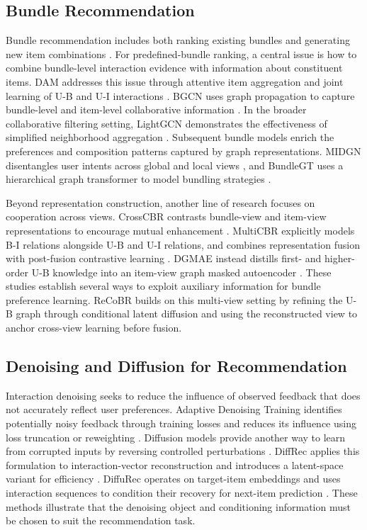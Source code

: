 \documentclass[letterpaper]{article}
\begin{document}
\subsection{Bundle Recommendation}

Bundle recommendation includes both ranking existing bundles and generating new item combinations \cite{sun2024survey}. For predefined-bundle ranking, a central issue is how to combine bundle-level interaction evidence with information about constituent items. DAM addresses this issue through attentive item aggregation and joint learning of U-B and U-I interactions \cite{chen2019dam}. BGCN uses graph propagation to capture bundle-level and item-level collaborative information \cite{chang2020bgcn}. In the broader collaborative filtering setting, LightGCN demonstrates the effectiveness of simplified neighborhood aggregation \cite{he2020lightgcn}. Subsequent bundle models enrich the preferences and composition patterns captured by graph representations. MIDGN disentangles user intents across global and local views \cite{zhao2022midgn}, and BundleGT uses a hierarchical graph transformer to model bundling strategies \cite{wei2023bundlegt}.

Beyond representation construction, another line of research focuses on cooperation across views. CrossCBR contrasts bundle-view and item-view representations to encourage mutual enhancement \cite{ma2022crosscbr}. MultiCBR explicitly models B-I relations alongside U-B and U-I relations, and combines representation fusion with post-fusion contrastive learning \cite{ma2024multicbr}. DGMAE instead distills first- and higher-order U-B knowledge into an item-view graph masked autoencoder \cite{ren2023dgmae}. These studies establish several ways to exploit auxiliary information for bundle preference learning. ReCoBR builds on this multi-view setting by refining the U-B graph through conditional latent diffusion and using the reconstructed view to anchor cross-view learning before fusion.

\subsection{Denoising and Diffusion for Recommendation}

Interaction denoising seeks to reduce the influence of observed feedback that does not accurately reflect user preferences. Adaptive Denoising Training identifies potentially noisy feedback through training losses and reduces its influence using loss truncation or reweighting \cite{wang2021adt}. Diffusion models provide another way to learn from corrupted inputs by reversing controlled perturbations \cite{ho2020ddpm}. DiffRec applies this formulation to interaction-vector reconstruction and introduces a latent-space variant for efficiency \cite{wang2023diffrec}. DiffuRec operates on target-item embeddings and uses interaction sequences to condition their recovery for next-item prediction \cite{li2023diffurec}. These methods illustrate that the denoising object and conditioning information must be chosen to suit the recommendation task.
\end{document}
